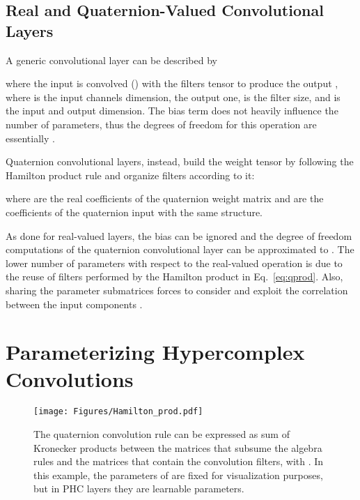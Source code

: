 \documentclass[lettersize,journal]{IEEEtran}
\begin{document}
\subsection{Real and Quaternion-Valued Convolutional Layers}



A generic convolutional layer can be described by


where the input  is convolved () with the filters tensor  to produce the output , where  is the input channels dimension,  the output one,  is the filter size, and  is the input and output dimension. The bias term  does not heavily influence the number of parameters, thus the degrees of freedom for this operation are essentially .

Quaternion convolutional layers, instead, build the weight tensor  by following the Hamilton product rule and organize filters according to it:







where  are the real coefficients of the quaternion weight matrix   and  are the coefficients of the quaternion input  with the same structure.


As done for real-valued layers, the bias can be ignored and the degree of freedom computations of the quaternion convolutional layer can be approximated to . The lower number of parameters with respect to the real-valued operation is due to the reuse of filters performed by the Hamilton product in Eq.~\ref{eq:qprod}. Also, sharing the parameter submatrices forces to consider and exploit the correlation between the input components \cite{ParcolletAIR2019, Tay2019QTRansformer, GaudetIJCNN2018}.


\section{Parameterizing Hypercomplex Convolutions}
\label{sec:phc}

\begin{figure*}[t]
    \begin{center}
        \texttt{[image: Figures/Hamilton\_prod.pdf]}
    \end{center}
    \caption{The quaternion convolution rule can be expressed as sum of Kronecker products between the matrices  that subsume the algebra rules and the matrices  that contain the convolution filters, with . In this example, the parameters of  are fixed for visualization purposes, but in PHC layers they are learnable parameters.}
    \label{fig:ham_prod}
\end{figure*}
\end{document}
